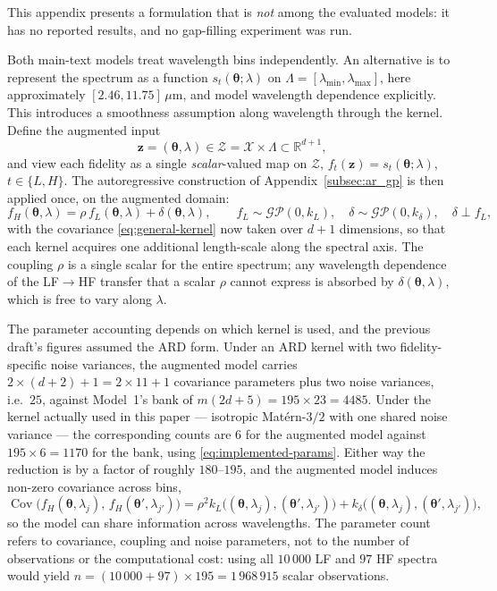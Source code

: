 \documentclass[12pt, letterpaper, oneside]{article}
\begin{document}
This appendix presents a formulation that is \emph{not} among the evaluated
models: it has no reported results, and no gap-filling experiment was run.

Both main-text models treat wavelength bins independently. An alternative
is to represent the spectrum as a function $s_t(\bm\theta;\lambda)$ on
$\Lambda=[\lambda_{\min},\lambda_{\max}]$, here approximately
$[2.46,11.75]\,\mu\mathrm{m}$, and model wavelength dependence explicitly.
This introduces a smoothness assumption along wavelength through the
kernel. Define the augmented input
\begin{equation}
    \mathbf{z} = (\bm\theta,\lambda) \in \mathcal{Z}
    = \mathcal{X}\times\Lambda \subset \mathbb{R}^{d+1},
    \label{eq:model2_augmented_input}
\end{equation}
and view each fidelity as a single \emph{scalar}-valued map on
$\mathcal{Z}$, $f_t(\mathbf{z}) = s_t(\bm\theta;\lambda)$, $t\in\{L,H\}$. The
autoregressive construction of Appendix~\ref{subsec:ar_gp} is then applied
once, on the augmented domain:
\begin{equation}
    f_{H}(\bm\theta,\lambda)
    = \rho\, f_{L}(\bm\theta,\lambda) + \delta(\bm\theta,\lambda),
    \qquad
    f_{L} \sim \mathcal{GP}(0,k_{L}),
    \quad
    \delta \sim \mathcal{GP}(0,k_{\delta}),
    \quad
    \delta \perp f_{L},
    \label{eq:model2_ar}
\end{equation}
with the covariance \eqref{eq:general-kernel} now taken over $d+1$ dimensions,
so that each kernel acquires one additional length-scale along the spectral
axis. The coupling $\rho$ is a single scalar for the entire spectrum; any
wavelength dependence of the LF$\to$HF transfer that a scalar $\rho$ cannot
express is absorbed by $\delta(\bm\theta,\lambda)$, which is free to vary along
$\lambda$.

The parameter accounting depends on which kernel is used, and the previous
draft's figures assumed the ARD form. Under an ARD kernel with two
fidelity-specific noise variances, the augmented model carries
$2\times(d+2)+1=2\times11+1$ covariance parameters plus two noise variances,
i.e.\ $25$, against Model~1's bank of $m(2d+5)=195\times23=4485$. Under the
kernel actually used in this paper --- isotropic Matérn-$3/2$ with one shared
noise variance --- the corresponding counts are $6$ for the augmented model
against $195\times6=1170$ for the bank, using \eqref{eq:implemented-params}.
Either way the reduction is by a factor of roughly $180$--$195$, and the
augmented model induces non-zero covariance across bins,
\begin{equation}
    \operatorname{Cov}\!\bigl(f_H(\bm\theta,\lambda_j),\,
    f_H(\bm\theta',\lambda_{j'})\bigr)
    = \rho^{2}k_{L}\bigl((\bm\theta,\lambda_j),(\bm\theta',\lambda_{j'})\bigr)
    + k_{\delta}\bigl((\bm\theta,\lambda_j),(\bm\theta',\lambda_{j'})\bigr),
    \label{eq:model2_crosscov}
\end{equation}
so the model can share information across wavelengths. The parameter count
refers to covariance, coupling and noise parameters, not to the number of
observations or the computational cost: using all $10\,000$ LF and $97$ HF
spectra would yield $n=(10\,000+97)\times195=1\,968\,915$ scalar observations.
\end{document}

